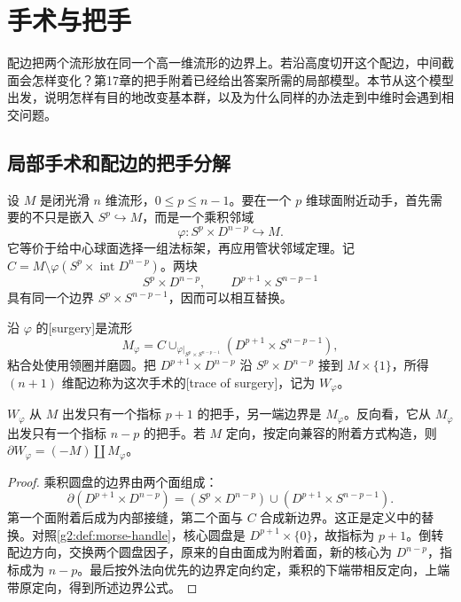 
% 
% 

\section{手术与把手}
\label{g2:sec:2303}

配边把两个流形放在同一个高一维流形的边界上。若沿高度切开这个配边，中间截面会怎样变化？第17章的把手附着已经给出答案所需的局部模型。本节从这个模型出发，说明怎样有目的地改变基本群，以及为什么同样的办法走到中维时会遇到相交问题。

\subsection{局部手术和配边的把手分解}
\label{g2:subsec:2303:01}
设 \(M\) 是闭光滑 \(n\) 维流形，\(0\le p\le n-1\)。要在一个 \(p\) 维球面附近动手，首先需要的不只是嵌入 \(S^p\hookrightarrow M\)，而是一个乘积邻域
\[
	\varphi:S^p\times D^{n-p}\hookrightarrow M.
\]
它等价于给中心球面选择一组法标架，再应用管状邻域定理。记 \(C=M\setminus\varphi(S^p\times\operatorname{int}D^{n-p})\)。两块
\[
	S^p\times D^{n-p},\qquad D^{p+1}\times S^{n-p-1}
\]
具有同一个边界 \(S^p\times S^{n-p-1}\)，因而可以相互替换。

\begin{definition}\label{g2:def:surgery}
	沿 \(\varphi\) 的[surgery]是流形
	\[
		M_\varphi=C\cup_{\varphi|_{S^p\times S^{n-p-1}}}(D^{p+1}\times S^{n-p-1}),
	\]
	粘合处使用领圈并磨圆。把 \(D^{p+1}\times D^{n-p}\) 沿 \(S^p\times D^{n-p}\) 接到 \(M\times\{1\}\)，所得 \((n+1)\) 维配边称为这次手术的[trace of surgery]，记为 \(W_\varphi\)。
\end{definition}

\begin{proposition}\label{g2:prop:surgery-trace}
	\(W_\varphi\) 从 \(M\) 出发只有一个指标 \(p+1\) 的把手，另一端边界是 \(M_\varphi\)。反向看，它从 \(M_\varphi\) 出发只有一个指标 \(n-p\) 的把手。若 \(M\) 定向，按定向兼容的附着方式构造，则 \(\partial W_\varphi=(-M)\amalg M_\varphi\)。
\end{proposition}
\begin{proof}
	乘积圆盘的边界由两个面组成：
	\[
		\partial(D^{p+1}\times D^{n-p})
		=(S^p\times D^{n-p})\cup(D^{p+1}\times S^{n-p-1}).
	\]
	第一个面附着后成为内部接缝，第二个面与 \(C\) 合成新边界。这正是定义中的替换。对照\cref{g2:def:morse-handle}，核心圆盘是 \(D^{p+1}\times\{0\}\)，故指标为 \(p+1\)。倒转配边方向，交换两个圆盘因子，原来的自由面成为附着面，新的核心为 \(D^{n-p}\)，指标成为 \(n-p\)。最后按外法向优先的边界定向约定，乘积的下端带相反定向，上端带原定向，得到所述边界公式。
\end{proof}

